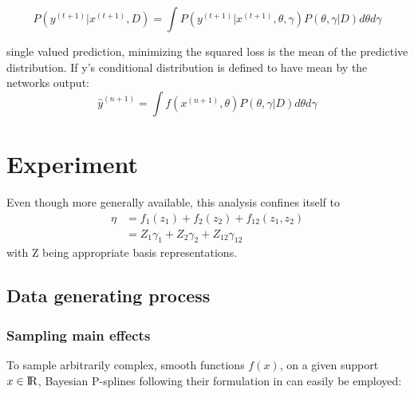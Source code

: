 \documentclass[11pt]{article}
\begin{document}
        \begin{equation}\label{BNNPosteriorPredictive1}
            P(y^{(t+1)}| x^{(t+1)}, D) = \int P(y^{(t+1)}| x^{(t+1)},\theta, \gamma) P (\theta , \gamma| D) d\theta d\gamma
        \end{equation}

        single valued prediction, minimizing the squared loss is the mean of the predictive distribution. If y's conditional distribution is defined to have mean by the networks output:
        \begin{equation}\label{predictiveSingleValueSQLoss1}
            \hat{y}^{(n+1)} = \int f(x^{(n+1)}, \theta) P(\theta, \gamma| D) d\theta d\gamma
        \end{equation}



    \clearpage
    \section{Experiment}
        Even though more generally available, this analysis confines itself to
        \begin{align}
            \eta &= f_1(z_1) + f_2(z_2) + f_{12}(z_1 , z_2) \\
                 &= Z_1 \gamma_1 + Z_2 \gamma_2 + Z_{12} \gamma_{12}
        \end{align}
        with Z being appropriate basis representations.
        \subsection{Data generating process}
            \subsubsection{Sampling main effects} \label{maineffect}
            To sample arbitrarily complex, smooth functions $f(x)$, on a given support $x \in {\rm I\!R}$, Bayesian P-splines following their formulation in \citep{fahrmeir2013regression} can easily be employed:
\end{document}
